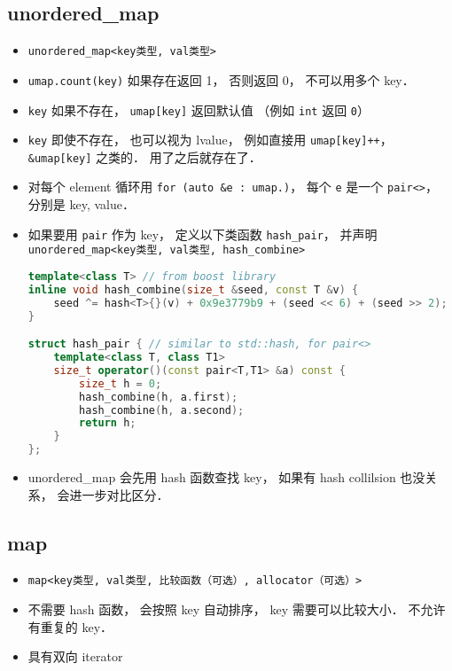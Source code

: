 \subsection{unordered_map}
\begin{itemize}
\item \verb|unordered_map<key类型, val类型>|
\item \verb|umap.count(key)| 如果存在返回 1， 否则返回 0， 不可以用多个 key．
\item \verb|key| 如果不存在， \verb|umap[key]| 返回默认值 （例如 \verb|int| 返回 \verb|0|）
\item \verb|key| 即使不存在， 也可以视为 lvalue， 例如直接用 \verb|umap[key]++|， \verb|&umap[key]| 之类的． 用了之后就存在了．
\item 对每个 element 循环用 \verb|for (auto &e : umap.)|， 每个 \verb|e| 是一个 \verb|pair<>|， 分别是 key, value．
\item 如果要用 \verb|pair| 作为 key， 定义以下类函数 \verb|hash_pair|， 并声明 \verb|unordered_map<key类型, val类型, hash_combine>|
\begin{lstlisting}[language=cpp]
template<class T> // from boost library
inline void hash_combine(size_t &seed, const T &v) {
    seed ^= hash<T>{}(v) + 0x9e3779b9 + (seed << 6) + (seed >> 2);
}

struct hash_pair { // similar to std::hash, for pair<>
    template<class T, class T1>
    size_t operator()(const pair<T,T1> &a) const {
        size_t h = 0;
        hash_combine(h, a.first);
        hash_combine(h, a.second);
        return h;
    }
};
\end{lstlisting}
\item unordered_map 会先用 hash 函数查找 key， 如果有 hash collilsion 也没关系， 会进一步对比区分．
\end{itemize}

\subsection{map}
\begin{itemize}
\item \verb|map<key类型, val类型, 比较函数（可选）, allocator（可选）>|
\item 不需要 hash 函数， 会按照 key 自动排序， key 需要可以比较大小． 不允许有重复的 key．
\item 具有双向 iterator
\end{itemize}

